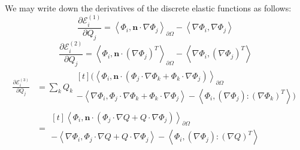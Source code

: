 \documentclass[reqno]{article}
\begin{document}
We may write down the derivatives of the discrete elastic functions as follows:
\begin{equation}
    \frac{\partial \mathcal{E}^{(1)}_i}{\partial Q_j}
    =
    \left< \Phi_i, \mathbf{n} \cdot \nabla \Phi_j \right>_{\partial \Omega}
    - \left< \nabla \Phi_i, \nabla \Phi_j \right>
\end{equation}
\begin{equation}
    \frac{\partial \mathcal{E}^{(2)}_i}{\partial Q_j}
    =
    \left< \Phi_i, \mathbf{n} \cdot \left( \nabla \Phi_j \right)^T \right>_{\partial \Omega}
    - \left< \nabla \Phi_i, \left( \nabla \Phi_j \right)^T \right>
\end{equation}
\begin{equation}
    \begin{split}
    \frac{\partial \mathcal{E}^{(3)}_i}{\partial Q_j}
        &=
        \sum_k Q_k
            \begin{multlined}[t]
            \biggl(
            \left< \Phi_i, \mathbf{n} \cdot \left( \Phi_j \cdot \nabla \Phi_k + \Phi_k \cdot \nabla \Phi_j \right) \right>_{\partial \Omega} \\
            - \left< \nabla \Phi_i, \Phi_j \cdot \nabla \Phi_k + \Phi_k \cdot \nabla \Phi_j \right>
            - \left< \Phi_i, \left( \nabla \Phi_j \right) : \left( \nabla \Phi_k \right)^T \right>
            \biggr)
            \end{multlined}\\
        &= 
        \begin{multlined}[t]
            \left< \Phi_i, \mathbf{n} \cdot \left( \Phi_j \cdot \nabla Q + Q \cdot \nabla \Phi_j \right) \right>_{\partial \Omega} \\
        - \left< \nabla \Phi_i, \Phi_j \cdot \nabla Q + Q \cdot \nabla \Phi_j \right>
        - \left< \Phi_i, \left( \nabla \Phi_j \right) : \left( \nabla Q \right)^T \right>
        \end{multlined}
    \end{split}
\end{equation}
\end{document}
